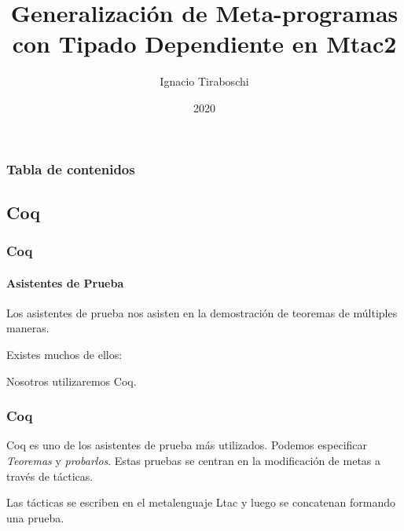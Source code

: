\documentclass{beamer}
\title[Generalización de Meta-programas]{Generalización de Meta-programas con Tipado Dependiente en Mtac2}
\author{Ignacio Tiraboschi}
\institute{UNC - FAMAF}
\date{2020}
\begin{document}
\frame{\titlepage}

\begin{frame}
\frametitle{Tabla de contenidos}
\tableofcontents
\end{frame}

\begin{frame}
\section{Coq}
\frametitle{Coq}
\framesubtitle{Asistentes de Prueba}

Los asistentes de prueba nos asisten en la demostración de teoremas de múltiples maneras.
\vspace{\baselineskip}

Existes muchos de ellos:
\vspace{\baselineskip}

Nosotros utilizaremos Coq.

\end{frame}

\begin{frame}
\frametitle{Coq}
Coq es uno de los asistentes de prueba más utilizados.
Podemos especificar \emph{Teoremas} y \emph{probarlos}.
Estas pruebas se centran en la modificación de metas a través de tácticas.
\vspace{\baselineskip}

Las tácticas se escriben en el metalenguaje Ltac y luego se concatenan formando una prueba.
\end{frame}

\end{document}

